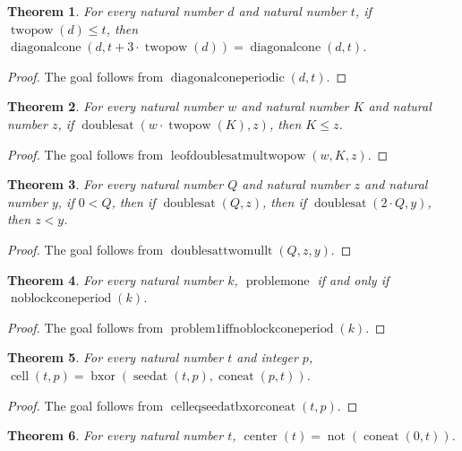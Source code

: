 \documentclass[11pt]{article}
\newtheorem{theorem}{Theorem}[section]
\theoremstyle{definition}
\begin{document}
\begin{theorem}
\label{ll:observations:diagonal-cone-periodic}
For every natural number \(d\) and natural number \(t\), if \(\operatorname{twopow}(d) \le t\), then \(\operatorname{diagonalcone}(d, t + 3 \cdot \operatorname{twopow}(d)) = \operatorname{diagonalcone}(d, t)\).
\end{theorem}
\begin{proof}
The goal follows from \(\operatorname{diagonalconeperiodic}(d, t)\).
\end{proof}
\begin{theorem}
\label{ll:observations:le-of-doubles-at-mul-twopow}
For every natural number \(w\) and natural number \(K\) and natural number \(z\), if \(\operatorname{doublesat}(w \cdot \operatorname{twopow}(K), z)\), then \(K \le z\).
\end{theorem}
\begin{proof}
The goal follows from \(\operatorname{leofdoublesatmultwopow}(w, K, z)\).
\end{proof}
\begin{theorem}
\label{ll:observations:doubles-at-two-mul-lt}
For every natural number \(Q\) and natural number \(z\) and natural number \(y\), if \(0 < Q\), then if \(\operatorname{doublesat}(Q, z)\), then if \(\operatorname{doublesat}(2 \cdot Q, y)\), then \(z < y\).
\end{theorem}
\begin{proof}
The goal follows from \(\operatorname{doublesattwomullt}(Q, z, y)\).
\end{proof}
\begin{theorem}
\label{ll:observations:problem1-iff-no-block-cone-period}
For every natural number \(k\), \(\operatorname{problemone}\) if and only if \(\operatorname{noblockconeperiod}(k)\).
\end{theorem}
\begin{proof}
The goal follows from \(\operatorname{problem1iffnoblockconeperiod}(k)\).
\end{proof}
\begin{theorem}
\label{ll:observations:cell-eq-seed-at-bxor-cone-at}
For every natural number \(t\) and integer \(p\), \(\operatorname{cell}(t, p) = \operatorname{bxor}(\operatorname{seedat}(t, p), \operatorname{coneat}(p, t))\).
\end{theorem}
\begin{proof}
The goal follows from \(\operatorname{celleqseedatbxorconeat}(t, p)\).
\end{proof}
\begin{theorem}
\label{ll:observations:center-eq-not-cone-at-zero}
For every natural number \(t\), \(\operatorname{center}(t) = \operatorname{not}(\operatorname{coneat}(0, t))\).
\end{theorem}
\end{document}
